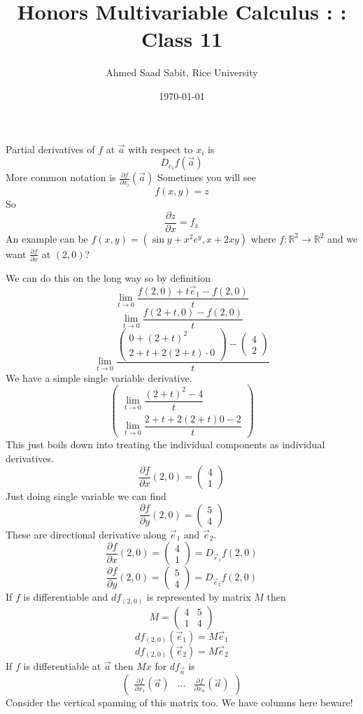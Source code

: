 \documentclass[letter]{article}
\title{Honors Multivariable Calculus : : Class 11}
\author{Ahmed Saad Sabit, Rice University}
\date{\today}
\begin{document}
\maketitle 

Partial derivatives of $f$ at $\vec{a}$ with respect to ${x}_i$ is 
\[
	D_{{e}_i} f(\vec{a}) 
\]
More common notation is $ \frac{\partial f}{\partial x_i} (\vec{a})$
Sometimes you will see 
\[
f(x,y) = z
\] 
So 
\[
\frac{\partial z}{\partial x} = f_x
\]
An example can be $f(x,y) = (\sin y + x^2 e^{y} , x+ 2 xy)$ where $f:\mathbb{R}^{2} \to \mathbb{R}^2$ and we want $\frac{\partial f}{\partial x}$ at $(2,0)$?

We can do this on the long way so by definition 
\[
\lim_{t \to 0} \frac{f(2,0) + t \vec{e}_1 - f(2,0)}{t}
\] 
\[
\lim_{t \to 0} \frac{f(2+t,0)   - f(2,0)}{t}
\] 
\[
\lim_{t \to 0}  
\frac{
\begin{pmatrix} 0 + (2+t)^2 \\ 2 + t + 2 (2+t) \cdot 0 \end{pmatrix} 
- 
\begin{pmatrix} 4 \\ 2 \end{pmatrix} 
}{t}
\]
We have a simple single variable derivative. 
\[
\begin{pmatrix} 
\lim_{t \to 0} \dfrac{(2+t)^2-4}{t} 
\\
\lim_{t \to 0} \dfrac{2+t+2(2+t)0 - 2}{t}
\end{pmatrix} 
\]
This just boils down into treating the individual components as individual derivatives. 
\[
\frac{\partial f}{\partial x} (2,0) = \begin{pmatrix} 4 \\ 1 \end{pmatrix} 
\]
Just doing single variable we can find 
\[
\frac{\partial f}{\partial y} (2,0) = \begin{pmatrix} 5\\4 \end{pmatrix} 
\]
These are directional derivative along $\vec{e}_1$ and $\vec{e}_2$. 
\[
	\frac{\partial f}{\partial x}(2,0) = \begin{pmatrix} 4 \\ 1 \end{pmatrix}  = D_{\vec{e}_1} f(2,0) 
\] 
\[
	\frac{\partial f}{\partial y} (2,0) = \begin{pmatrix} 5\\4 \end{pmatrix} = D_{\vec{e}_2} f(2,0)
\]
If $f$ is differentiable and $df_(2,0)$ is represented by matrix $M$ then 
 \[
	 M = \begin{pmatrix} 4 & 5 \\ 1 & 4 \end{pmatrix} 
\]
\[
d f_{(2,0)} (\vec{e}_1) = M \vec{e}_1
\]
\[
	d f_{(2,0)} (\vec{e}_2) = M \vec{e}_2
\]
If $f$ is differentiable at $\vec{a}$ then $Mx$ for $d f_{\vec{a}}$ is 
\[
\begin{pmatrix} 
	\frac{\partial f}{\partial x_1} (\vec{a}) & \ldots& \frac{ \partial f }{\partial x_n} (\vec{a})
\end{pmatrix} 
\] Consider the vertical spanning of this matrix too. We have columns here beware! 
\end{document}
